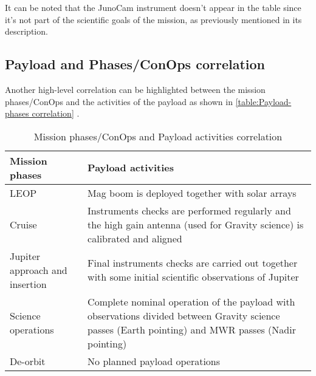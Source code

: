 It can be noted that the JunoCam instrument doesn't appear in the table since it's not part of the scientific goals of the mission, as previously mentioned in its description.

\subsection{Payload and Phases/ConOps correlation}
Another high-level correlation can be highlighted between the mission phases/ConOps and the activities of the payload as shown in \autoref{table:Payload-phases correlation} \cite{Juno_launch}.

\begin{table}[H]
    \renewcommand{\arraystretch}{1.5}
    \centering
    \begin{tabularx}{\linewidth}{|X|X|}
        \hline
        \textbf{Mission phases} & \textbf{Payload activities} \\
        \hline
        \hline
        LEOP & Mag boom is deployed together with solar arrays \\
        \hline
        Cruise & Instruments checks are performed regularly and the high gain antenna (used for Gravity science) is calibrated and aligned \\
        \hline
        Jupiter approach and insertion & Final instruments checks are carried out together with some initial scientific observations of Jupiter \\
        \hline
        Science operations & Complete nominal operation of the payload with observations divided between Gravity science passes (Earth pointing) and MWR passes (Nadir pointing) \\
        \hline
        De-orbit & No planned payload operations \\
        \hline
    \end{tabularx}
    \caption{Mission phases/ConOps and Payload activities correlation}
    \label{table:Payload-phases correlation}
\end{table}